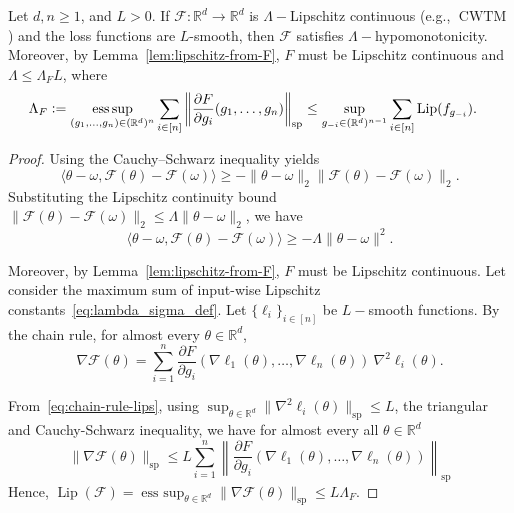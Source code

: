 \documentclass[twoside,11pt]{article}
\newcommand{\R}{\mathbb{R}}
\newcommand{\F}{\mathcal{F}}
\DeclareMathOperator*{\esssup}{ess\,sup}
\begin{document}
\begin{theorem}\label{thm:lipschitz-to-hypomonotone}
Let $d, n \geq 1$, and $L>0$. 
If $\F: \R^d \to \R^d$ is $\Lambda-$Lipschitz continuous (e.g., $\operatorname{CWTM}$) and the loss functions are $L$-smooth, then $\F$ satisfies $\Lambda-$hypomonotonicity.
Moreover, by Lemma~\ref{lem:lipschitz-from-F}, $F$ must be Lipschitz continuous and $\Lambda \leq \Lambda_F L$, where
\begin{align}\label{eq:lambda_sigma_def} 
    \Lambda_F 
    &\vcentcolon= 
    \esssup_{(g_1, \ldots, g_n) \in (\mathbb{R}^d)^n} \sum_{i\in[n]} \left\| \frac{\partial F}{\partial g_i}(g_1, \ldots, g_n) \right\|_{\text{sp}}
    \leq \sup_{g_{-i} \in (\mathbb{R}^d)^{n-1}} \sum_{i\in[n]} \operatorname{Lip}(f_{g_{-i}}).
\end{align}
\end{theorem}
\begin{proof}
Using the Cauchy–Schwarz inequality yields
\begin{equation*}
    \langle \theta - \omega, \F(\theta) - \F(\omega) \rangle \ge - \|\theta - \omega\|_2 \|\F(\theta) - \F(\omega)\|_2.
\end{equation*}
Substituting the Lipschitz continuity bound $\|\F(\theta) - \F(\omega)\|_2 \leq \Lambda \|\theta - \omega\|_2$, we have
\begin{equation*}
    \langle \theta - \omega, \F(\theta) - \F(\omega) \rangle \geq - \Lambda \|\theta - \omega\|^2.
\end{equation*}

Moreover, by Lemma~\ref{lem:lipschitz-from-F}, $F$ must be Lipschitz continuous.
Let consider the maximum sum of input-wise Lipschitz constants~\eqref{eq:lambda_sigma_def}.
Let $\{ \ell_i \}_{i\in[n]}$ be $L-$smooth functions.
By the chain rule, for almost every $\theta \in \R^d$,
\begin{equation}\label{eq:chain-rule-lips}
    \nabla\F(\theta) = \sum_{i=1}^n \frac{\partial F}{\partial g_i}(\nabla \ell_1(\theta), \ldots, \nabla \ell_n(\theta))\ \nabla^2 \ell_i(\theta).
\end{equation}

From~\eqref{eq:chain-rule-lips}, using $\sup_{\theta\in\R^d}\|\nabla^2 \ell_i(\theta)\|_{\text{sp}} \leq L$, the triangular and Cauchy-Schwarz inequality, we have for almost every all $\theta\in\R^d$
\begin{equation*}\label{eq:Lipschitz-for-F}
    \|\nabla\F(\theta)\|_{\text{sp}} 
    \leq L \sum_{i=1}^n \left\| \frac{\partial F}{\partial g_i}(\nabla \ell_1(\theta), \ldots, \nabla \ell_n(\theta)) \right\|_{\text{sp}}
\end{equation*}
Hence, $\operatorname{Lip}(\F) = \operatorname{ess\ sup}_{\theta \in \R^d} \| \nabla\F(\theta) \|_{\text{sp}} \leq L \Lambda_F$.
\end{proof}
\end{document}
